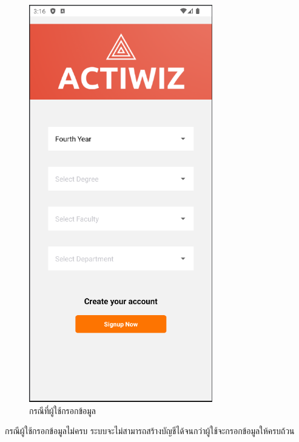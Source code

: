 \documentclass[14pt,oneside,openright,a4paper]{cpe-thai-project}
\begin{document}
\begin{figure}[!h]\centering
  \includegraphics[width=8cm]{./Pictures/DataNotComplete.png}
  \caption{กรณีที่ผู้ใช้กรอกข้อมูล}\label{fig:DataNotCompleteTest}
\end{figure}
  \hspace*{1cm} กรณีผู้ใช้กรอกข้อมูลไม่ครบ ระบบจะไม่สามารถสร้างบัญชีได้จนกว่าผู้ใช้จะกรอกข้อมูลให้ครบถ้วน

\newpage
\end{document}
